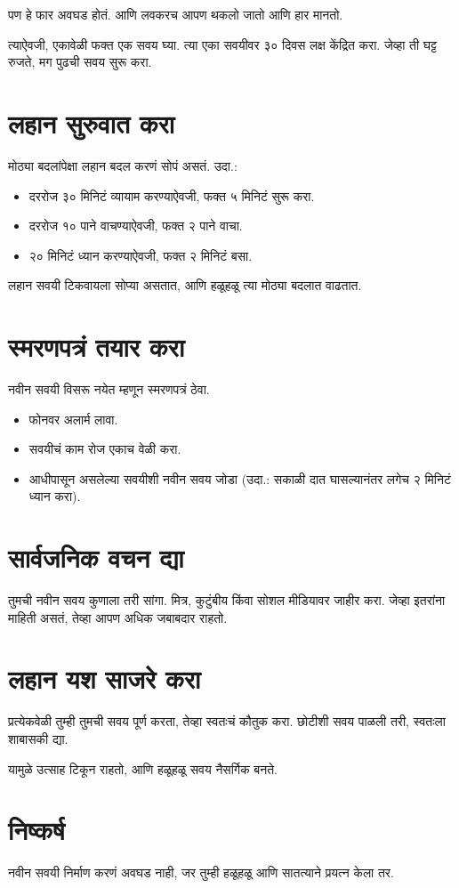 पण हे फार अवघड होतं.  
आणि लवकरच आपण थकलो जातो आणि हार मानतो.  

त्याऐवजी, एकावेळी फक्त एक सवय घ्या.  
त्या एका सवयीवर ३० दिवस लक्ष केंद्रित करा.  
जेव्हा ती घट्ट रुजते,  
मग पुढची सवय सुरू करा.  

\section*{लहान सुरुवात करा}
मोठ्या बदलांपेक्षा लहान बदल करणं सोपं असतं.  
उदा.:  
\begin{itemize}
\item दररोज ३० मिनिटं व्यायाम करण्याऐवजी, फक्त ५ मिनिटं सुरू करा.  
\item दररोज १० पाने वाचण्याऐवजी, फक्त २ पाने वाचा.  
\item २० मिनिटं ध्यान करण्याऐवजी, फक्त २ मिनिटं बसा.  
\end{itemize}

लहान सवयी टिकवायला सोप्या असतात,  
आणि हळूहळू त्या मोठ्या बदलात वाढतात.  

\section*{स्मरणपत्रं तयार करा}
नवीन सवयी विसरू नयेत म्हणून स्मरणपत्रं ठेवा.  
\begin{itemize}
\item फोनवर अलार्म लावा.  
\item सवयीचं काम रोज एकाच वेळी करा.  
\item आधीपासून असलेल्या सवयीशी नवीन सवय जोडा  
(उदा.: सकाळी दात घासल्यानंतर लगेच २ मिनिटं ध्यान करा).  
\end{itemize}

\section*{सार्वजनिक वचन द्या}
तुमची नवीन सवय कुणाला तरी सांगा.  
मित्र, कुटुंबीय किंवा सोशल मीडियावर जाहीर करा.  
जेव्हा इतरांना माहिती असतं,  
तेव्हा आपण अधिक जबाबदार राहतो.  

\section*{लहान यश साजरे करा}
प्रत्येकवेळी तुम्ही तुमची सवय पूर्ण करता,  
तेव्हा स्वतःचं कौतुक करा.  
छोटीशी सवय पाळली तरी,  
स्वतःला शाबासकी द्या.  

यामुळे उत्साह टिकून राहतो,  
आणि हळूहळू सवय नैसर्गिक बनते.  

\section*{निष्कर्ष}
नवीन सवयी निर्माण करणं अवघड नाही,  
जर तुम्ही हळूहळू आणि सातत्याने प्रयत्न केला तर.  

